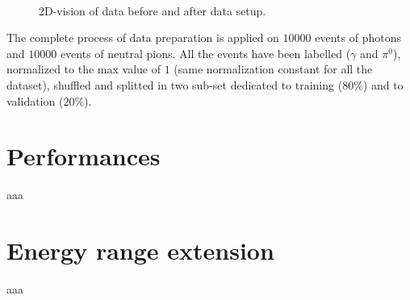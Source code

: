 \begin{figure}
	\centering
	 \quad
	 \\
	 \quad
	\caption{2D-vision of data before and after data setup.}
	\label{fig:2Dvision}
\end{figure}

The complete process of data preparation is applied on $10000$ events of photons and $10000$ events of neutral pions. All the events have been labelled ($\gamma$ and $\pi^0$), normalized to the max value of $1$ (same normalization constant for all the dataset), shuffled and splitted in two sub-set dedicated to training ($80\%$) and to validation ($20\%$).\\

\section{Performances}\label{sec:NN_perf}
aaa

\section{Energy range extension}
aaa